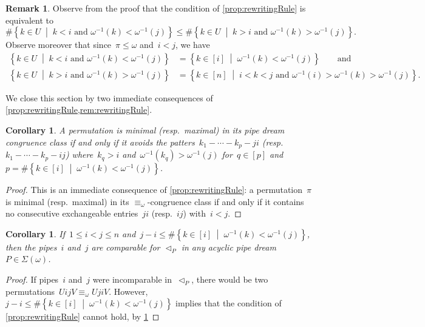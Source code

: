 \documentclass[reqno]{amsart}
\newtheorem{corollary}[theorem]{Corollary}
\theoremstyle{definition}
\newtheorem{remark}[theorem]{Remark}
\newcommand{\set}[2]{\left\{ #1 \;\middle|\; #2 \right\}} %
\newcommand{\acyclicPipeDreams}{\Sigma} %
\newcommand{\less}{\vartriangleleft} %
\newcommand{\contactLess}[1]{\less_{#1}} %
\begin{document}
\begin{remark}
\label{rem:rewritingRule}
Observe from the proof that the condition of \cref{prop:rewritingRule} is equivalent to
\[
\# \set{k \in U}{k < i \text{ and } \omega^{-1}(k) < \omega^{-1}(j)} \le \# \set{k \in U}{k > i \text{ and } \omega^{-1}(k) > \omega^{-1}(j)}.
\]
Observe moreover that since~$\pi \le \omega$ and~$i < j$, we have
\begin{align*}
\set{k \in U}{k < i \text{ and } \omega^{-1}(k) < \omega^{-1}(j)} & = \set{k \in [i]}{\omega^{-1}(k) < \omega^{-1}(j)} \qquad \text{and}\\
\set{k \in U}{k > i \text{ and } \omega^{-1}(k) > \omega^{-1}(j)} & = \set{k \in [n]}{i < k < j \text{ and } \omega^{-1}(i) > \omega^{-1}(k) > \omega^{-1}(j)}.
\end{align*}
\end{remark}

We close this section by two immediate consequences of \cref{prop:rewritingRule,rem:rewritingRule}.

\begin{corollary}
\label{coro:patternAvoiding}
A permutation is minimal (resp.~maximal) in its pipe dream congruence class if and only if it avoids the patters~$k_1 - \cdots - k_p - ji$ (resp.~$k_1 - \cdots - k_p - ij$) where~$k_q > i$ and~$\omega^{-1}(k_q) > \omega^{-1}(j)$ for~$q \in [p]$ and~$p = \# \set{k \in [i]}{\omega^{-1}(k) < \omega^{-1}(j)}$.
\end{corollary}

\begin{proof}
This is an immediate consequence of \cref{prop:rewritingRule}: a permutation~$\pi$ is minimal (resp.~maximal) in its $\equiv_\omega$-congruence class if and only if it contains no consecutive exchangeable entries~$ji$ (resp.~$ij$) with~$i < j$.
\end{proof}

\begin{corollary}
\label{coro:canopy}
If~$1 \le i < j \le n$ and~$j-i \le \#\set{k \in [i]}{\omega^{-1}(k) < \omega^{-1}(j)}$, then the pipes~$i$ and~$j$ are comparable for $\contactLess{P}$ in any acyclic pipe dream~$P \in \acyclicPipeDreams(\omega)$.
\end{corollary}

\begin{proof}
If pipes~$i$ and~$j$ were incomparable in~$\contactLess{P}$, there would be two permutations~$UijV \equiv_\omega UjiV$.
However, $j-i \le \#\set{k \in [i]}{\omega^{-1}(k) < \omega^{-1}(j)}$ implies that the condition of \cref{prop:rewritingRule} cannot hold, by \cref{rem:rewritingRule}
\end{proof}
\end{document}
